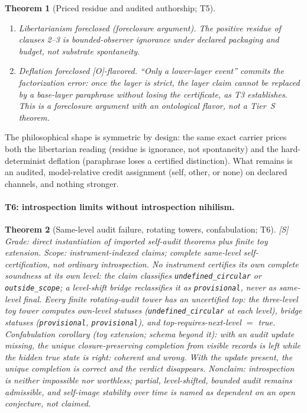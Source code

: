 \documentclass[11pt]{article}
\newcommand{\gradeS}{\textsf{[S]}}
\newcommand{\gradeO}{\textsf{[O]}}
\newtheorem{theorem}{Theorem}[section]
\theoremstyle{definition}
\begin{document}
\begin{theorem}[Priced residue and audited authorship; T5]
\begin{enumerate}
exactly into clock and content channels, both balanced ($0$ versus $0$ on
credited products; canonical lifted cycle $1/324$ each way), so the same rule
returns \emph{none}. Deterministic coarsening of the blocked case leaves
equal path fluxes ($1/27$ each way): observation does not create affinity.
\item \emph{Libertarianism foreclosed} (foreclosure argument). The positive
residue of clauses 2--3 is bounded-observer ignorance under declared
packaging and budget, not substrate spontaneity.
\item \emph{Deflation foreclosed} \gradeO-flavored. ``Only a lower-layer
event'' commits the factorization error: once the layer is strict, the layer
claim cannot be replaced by a base-layer paraphrase without losing the
certificate, as T3 establishes. This is a foreclosure argument with an
ontological flavor, not a Tier~S theorem.
\end{enumerate}
\end{theorem}

The philosophical shape is symmetric by design: the same exact carrier
prices both the libertarian reading (residue is ignorance, not spontaneity)
and the hard-determinist deflation (paraphrase loses a certified
distinction). What remains is an audited, model-relative credit assignment
(self, other, or none) on declared channels, and nothing stronger.

\paragraph{T6: introspection limits without introspection nihilism.}
\begin{theorem}[Same-level audit failure, rotating towers, confabulation; T6]
\gradeS{} \emph{Grade:} direct instantiation of imported self-audit theorems
plus finite toy extension. \emph{Scope:} instrument-indexed claims; complete
same-level self-certification, not ordinary introspection. No instrument
certifies its own complete soundness at its own level: the claim classifies
\texttt{undefined\_circular} or \texttt{outside\_scope}; a level-shift bridge
reclassifies it as \texttt{provisional}, never as same-level final. Every
finite rotating-audit tower has an uncertified top: the three-level toy tower
computes own-level statuses (\texttt{undefined\_circular} at each level),
bridge statuses (\texttt{provisional}, \texttt{provisional}), and
top-requires-next-level $=$ true. \emph{Confabulation corollary} (toy
extension; schema beyond it): with an audit update missing, the unique
closure-preserving completion from visible records is \emph{left} while the
hidden true state is \emph{right}: coherent and wrong. With the update
present, the unique completion is correct and the verdict disappears.
\emph{Nonclaim:} introspection is neither impossible nor worthless; partial,
level-shifted, bounded audit remains admissible, and self-image stability
over time is named as dependent on an open conjecture, not claimed.
\end{theorem}
\end{document}
